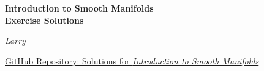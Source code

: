 \begin{titlepage}
    \centering
    \vspace*{5cm}

    {\Huge\bfseries Introduction to Smooth Manifolds\\Exercise Solutions\par}
    \vspace{2em}
    {\Large\itshape Larry\par}
    \vspace{1em}
    {\normalsize\ttfamily\href{https://github.com/xiaolingyun1/Solutions-for-Introduction-to-Smooth-Manifolds}{GitHub Repository: Solutions for \textit{Introduction to Smooth Manifolds}}\par}


    \vfill
\end{titlepage}